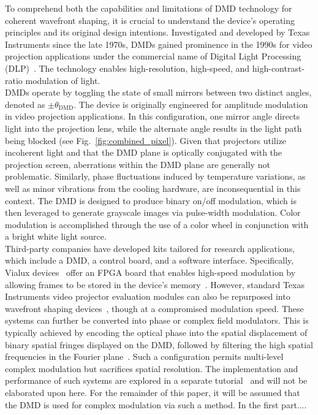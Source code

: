 \documentclass[12pt]{iopart}
\begin{document}
To comprehend both the capabilities and limitations
of DMD technology for coherent wavefront shaping,
it is crucial to understand the device's operating principles
and its original design intentions.
Investigated and developed by Texas Instruments since the late 1970s,
DMDs gained prominence in the 1990s for video projection applications
under the commercial name of Digital Light Processing (DLP)~\cite{Dudley2003emerging}.
The technology enables high-resolution, high-speed, and high-contrast-ratio modulation of light.\\
DMDs operate by toggling the state of small mirrors between two distinct angles, denoted as $\pm \theta_\text{DMD}$.
The device is originally engineered for amplitude modulation in video projection applications.
In this configuration, one mirror angle directs light into the projection lens,
while the alternate angle results in the light path being blocked (see Fig.~\ref{fig:combined_pixel}).
Given that projectors utilize incoherent light and that the DMD plane is optically conjugated with the projection screen,
aberrations within the DMD plane are generally not problematic.
Similarly, phase fluctuations induced by temperature variations,
as well as minor vibrations from the cooling hardware, are inconsequential in this context.
The DMD is designed to produce binary on/off modulation,
which is then leveraged to generate grayscale images via pulse-width modulation.
Color modulation is accomplished through the use of a color wheel in conjunction with a bright white light source.\\

Third-party companies have developed kits tailored for research applications,
which include a DMD, a control board, and a software interface.
Specifically, Vialux devices~\cite{vialux} offer an FPGA board that enables high-speed modulation
by allowing frames to be stored in the device's memory~\cite{hofling2004alp}.
However, standard Texas Instruments video projector evaluation modules can also be repurposed into wavefront shaping devices~\cite{Cox2021converting},
though at a compromised modulation speed.
These systems can further be converted into phase or complex field modulators.
This is typically achieved by encoding the optical phase into
the spatial displacement of binary spatial fringes displayed on the DMD,
followed by filtering the high spatial frequencies in the Fourier plane~\cite{lee1979binary}.
Such a configuration permits multi-level complex modulation but sacrifices spatial resolution.
The implementation and performance of such systems are explored in a separate tutorial~\cite{Gutierrez2024DMD}
and will not be elaborated upon here.
For the remainder of this paper, it will be assumed that the DMD is used for complex modulation via such a method.
In the first part....\\
\end{document}
